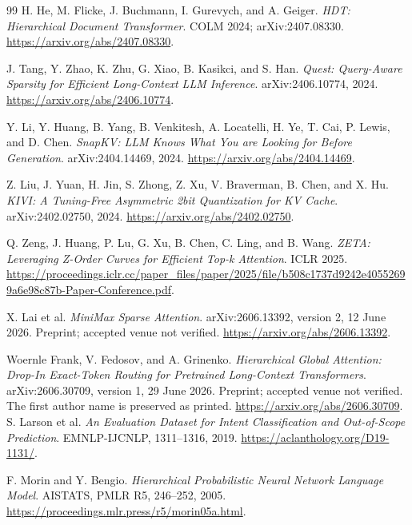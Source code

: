 \documentclass[11pt]{article}
\begin{document}
\begin{thebibliography}{99}
H. He, M. Flicke, J. Buchmann, I. Gurevych, and A. Geiger.
\emph{HDT: Hierarchical Document Transformer}. COLM 2024;
arXiv:2407.08330. \url{https://arxiv.org/abs/2407.08330}.

J. Tang, Y. Zhao, K. Zhu, G. Xiao, B. Kasikci, and S. Han.
\emph{Quest: Query-Aware Sparsity for Efficient Long-Context LLM Inference}.
arXiv:2406.10774, 2024. \url{https://arxiv.org/abs/2406.10774}.

Y. Li, Y. Huang, B. Yang, B. Venkitesh, A. Locatelli, H. Ye, T. Cai,
P. Lewis, and D. Chen.
\emph{SnapKV: LLM Knows What You are Looking for Before Generation}.
arXiv:2404.14469, 2024. \url{https://arxiv.org/abs/2404.14469}.

Z. Liu, J. Yuan, H. Jin, S. Zhong, Z. Xu, V. Braverman, B. Chen, and X. Hu.
\emph{KIVI: A Tuning-Free Asymmetric 2bit Quantization for KV Cache}.
arXiv:2402.02750, 2024. \url{https://arxiv.org/abs/2402.02750}.

Q. Zeng, J. Huang, P. Lu, G. Xu, B. Chen, C. Ling, and B. Wang.
\emph{ZETA: Leveraging Z-Order Curves for Efficient Top-k Attention}.
ICLR 2025.
\url{https://proceedings.iclr.cc/paper_files/paper/2025/file/b508c1737d9242e40552699a6e98c87b-Paper-Conference.pdf}.

X. Lai et al.
\emph{MiniMax Sparse Attention}.
arXiv:2606.13392, version 2, 12 June 2026. Preprint; accepted venue not
verified. \url{https://arxiv.org/abs/2606.13392}.

Woernle Frank, V. Fedosov, and A. Grinenko.
\emph{Hierarchical Global Attention: Drop-In Exact-Token Routing for Pretrained
Long-Context Transformers}. arXiv:2606.30709, version 1, 29 June 2026.
Preprint; accepted venue not verified. The first author name is preserved as
printed. \url{https://arxiv.org/abs/2606.30709}.
S. Larson et al. \emph{An Evaluation Dataset for Intent Classification and
Out-of-Scope Prediction}. EMNLP-IJCNLP, 1311--1316, 2019.
\url{https://aclanthology.org/D19-1131/}.

F. Morin and Y. Bengio. \emph{Hierarchical Probabilistic Neural Network
Language Model}. AISTATS, PMLR R5, 246--252, 2005.
\url{https://proceedings.mlr.press/r5/morin05a.html}.


\end{thebibliography}
\end{document}
